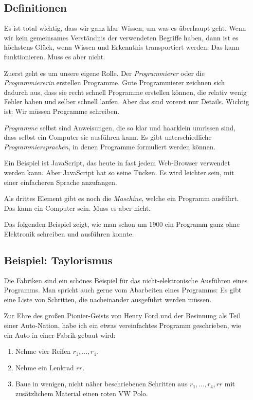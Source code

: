 \documentclass[a5paper,ngerman,9pt]{article}
\begin{document}
\begin{multicols}{2}
	\subsection{Definitionen}

	Es ist total wichtig, dass wir ganz klar Wissen, um was es überhaupt
	geht.
	Wenn wir kein gemeinsames Verständnis der verwendeten Begriffe haben,
	dann ist es höchstens Glück, wenn Wissen und Erkenntnis transportiert
	werden.
	Das kann funktionieren. Muss es aber nicht.

	Zuerst geht es um unsere eigene Rolle.
	Der \emph{Programmierer} oder die \emph{Programmiererin} erstellen
	Programme.
	Gute Programmierer zeichnen sich dadurch aus, dass sie recht schnell
	Programme erstellen können, die relativ wenig Fehler haben und
	selber schnell laufen.
	Aber das sind vorerst nur Details.
	Wichtig ist: Wir müssen Programme schreiben.

	\emph{Programme} selbst sind Anweisungen, die so klar und haarklein
	umrissen sind, dass selbst ein Computer sie ausführen kann.
	Es gibt unterschiedliche \emph{Programmiersprachen}, in denen
	Programme formuliert werden können.

	Ein Beispiel ist JavaScript, das heute in fast jedem Web-Browser
	verwendet werden kann.
	Aber JavaScript hat so seine Tücken.
	Es wird leichter sein, mit einer einfacheren Sprache anzufangen.

	Als drittes Element gibt es noch die \emph{Maschine}, welche ein
	Programm ausführt.
	Das kann ein Computer sein.
	Muss es aber nicht.

	Das folgenden Beispiel zeigt, wie man schon um 1900 ein Programm
	ganz ohne Elektronik schreiben und ausführen konnte.

	\subsection{Beispiel: Taylorismus}

	Die Fabriken sind ein schönes Beispiel für das nicht-elektronische
	Ausführen eines Programms.
	Man spricht auch gerne vom Abarbeiten eines Programms:
	Es gibt eine Liste von Schritten, die nacheinander ausgeführt werden
	müssen.

	Zur Ehre des großen Pionier-Geists von Henry Ford und der Besinnung
	als Teil einer Auto-Nation, habe ich ein etwas vereinfachtes
	Programm geschrieben, wie ein Auto in einer Fabrik gebaut wird:

	\begin{enumerate}
		\item Nehme vier Reifen $r_1,\ldots,r_4$.
		\item Nehme ein Lenkrad $rr$.
		\item Baue in wenigen, nicht näher beschriebenen Schritten aus
			$r_1,\ldots,r_4,rr$ mit zusätzlichem Material einen roten
			VW Polo.
	\end{enumerate}


\end{multicols}
\end{document}
